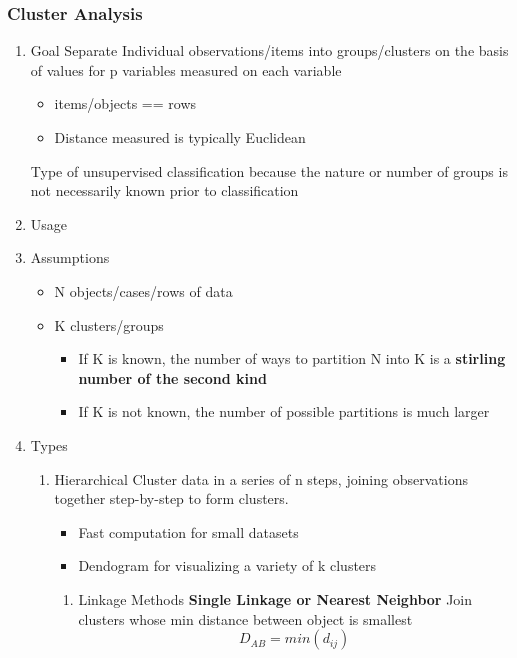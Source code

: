 \documentclass[11pt]{article}
\begin{document}
\subsubsection{Cluster Analysis}
\label{sec:org62a4e83}
\begin{enumerate}
\item Goal
\label{sec:org0b28829}
Separate Individual observations/items into groups/clusters on the basis
of values for p variables measured on each variable

\begin{itemize}
\item items/objects == rows
\item Distance measured is typically Euclidean
\end{itemize}

Type of unsupervised classification because the nature or number of
groups is not necessarily known prior to classification

\item Usage
\label{sec:org1ed5d7a}

\item Assumptions
\label{sec:org6d03fd2}
\begin{itemize}
\item N objects/cases/rows of data
\item K clusters/groups

\begin{itemize}
\item If K is known, the number of ways to partition N into K is a
\textbf{stirling number of the second kind}
\item If K is not known, the number of possible partitions is much
larger
\end{itemize}
\end{itemize}

\item Types
\label{sec:org09d23f3}
\begin{enumerate}
\item Hierarchical
\label{sec:org25f2dba}
Cluster data in a series of n steps, joining observations together
step-by-step to form clusters.

\begin{itemize}
\item Fast computation for small datasets
\item Dendogram for visualizing a variety of k clusters
\end{itemize}

\begin{enumerate}
\item Linkage Methods
\label{sec:orgdea0e9d}
\textbf{Single Linkage or Nearest Neighbor} Join clusters whose min distance
between object is smallest $$
D_{AB} = min(d_{ij})
$$


\end{enumerate}
\end{enumerate}
\end{enumerate}
\end{document}
